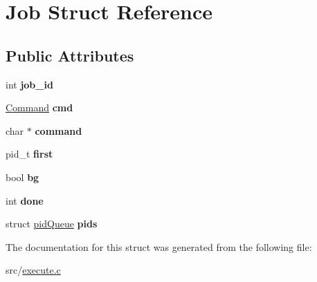 \hypertarget{structJob}{}\section{Job Struct Reference}
\label{structJob}
\subsection*{Public Attributes}
\begin{DoxyCompactItemize}
\item 
int {\bfseries job\+\_\+id}\hypertarget{structJob_ab154568a2319db1e0cf6296872e6a398}{}\label{structJob_ab154568a2319db1e0cf6296872e6a398}

\item 
\hyperlink{unionCommand}{Command} {\bfseries cmd}\hypertarget{structJob_ab2c31cbc7fdc94323f0c12fe0e07beda}{}\label{structJob_ab2c31cbc7fdc94323f0c12fe0e07beda}

\item 
char $\ast$ {\bfseries command}\hypertarget{structJob_a023c089afc56536e3e004cea4c605c1a}{}\label{structJob_a023c089afc56536e3e004cea4c605c1a}

\item 
pid\+\_\+t {\bfseries first}\hypertarget{structJob_a3abd89cfdeaed5f20ac213db2bb0a560}{}\label{structJob_a3abd89cfdeaed5f20ac213db2bb0a560}

\item 
bool {\bfseries bg}\hypertarget{structJob_ae2473991ef97b97f0bd354f33aedb2a0}{}\label{structJob_ae2473991ef97b97f0bd354f33aedb2a0}

\item 
int {\bfseries done}\hypertarget{structJob_a2cc918823b3a8843f7bbd920710003ad}{}\label{structJob_a2cc918823b3a8843f7bbd920710003ad}

\item 
struct \hyperlink{structpidQueue}{pid\+Queue} {\bfseries pids}\hypertarget{structJob_acdd53e112b611d0ce35c7a1148ca1c1a}{}\label{structJob_acdd53e112b611d0ce35c7a1148ca1c1a}

\end{DoxyCompactItemize}


The documentation for this struct was generated from the following file\+:\begin{DoxyCompactItemize}
\item 
src/\hyperlink{execute_8c}{execute.\+c}\end{DoxyCompactItemize}
